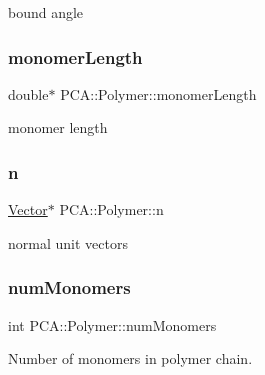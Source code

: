 bound angle 

\hypertarget{class_p_c_a_1_1_polymer_adec33c5274834c85479abefe537efa5a}{}\label{class_p_c_a_1_1_polymer_adec33c5274834c85479abefe537efa5a} 
\subsubsection{\texorpdfstring{monomer\+Length}{monomerLength}}
{\footnotesize\ttfamily double$\ast$ P\+C\+A\+::\+Polymer\+::monomer\+Length\hspace{0.3cm}{\ttfamily [protected]}}



monomer length 

\hypertarget{class_p_c_a_1_1_polymer_a7c71d8f5516ae0b0ead3929296135d1b}{}\label{class_p_c_a_1_1_polymer_a7c71d8f5516ae0b0ead3929296135d1b} 
\subsubsection{\texorpdfstring{n}{n}}
{\footnotesize\ttfamily \hyperlink{class_p_c_a_1_1_vector}{Vector}$\ast$ P\+C\+A\+::\+Polymer\+::n\hspace{0.3cm}{\ttfamily [protected]}}



normal unit vectors 

\hypertarget{class_p_c_a_1_1_polymer_a8dadd2d6d6d65b79909f274acd63fd1e}{}\label{class_p_c_a_1_1_polymer_a8dadd2d6d6d65b79909f274acd63fd1e} 
\subsubsection{\texorpdfstring{num\+Monomers}{numMonomers}}
{\footnotesize\ttfamily int P\+C\+A\+::\+Polymer\+::num\+Monomers\hspace{0.3cm}{\ttfamily [protected]}}



Number of monomers in polymer chain. 

\hypertarget{class_p_c_a_1_1_polymer_a9822e3b9c3420a04a689706b84e586ca}{}\label{class_p_c_a_1_1_polymer_a9822e3b9c3420a04a689706b84e586ca} 
